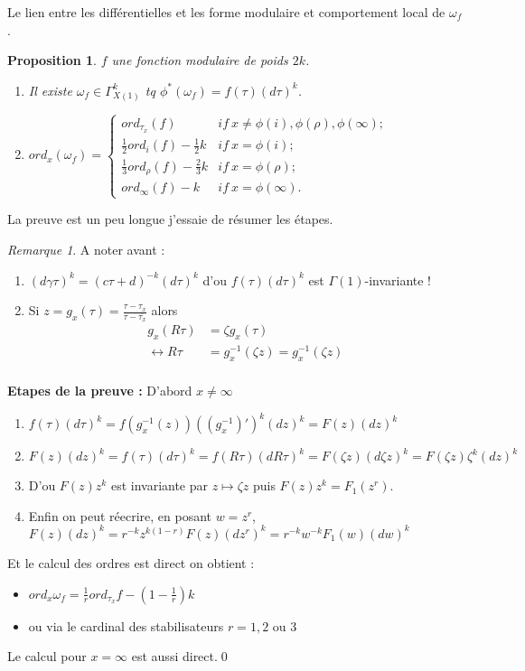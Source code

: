 \documentclass[12pt]{article}
\theoremstyle{plain}
\newtheorem{prop}[subsubsection]{Proposition}
\theoremstyle{definition}
\theoremstyle{remark}
\newtheorem{rem}{Remarque}
\newcommand{\w}{\omega}
\begin{document}
Le lien entre les différentielles et les forme modulaire et comportement local de $\w_f$.
\begin{prop}
    $f$ une fonction modulaire de poids $2k$.
    \begin{enumerate}
        \item Il existe $\w_f\in\Gamma_{X(1)}^k$ tq $\phi^*(\w_f)=f(\tau)(d\tau)^k$.
        \item $ord_x(\w_f)=\begin{cases}
            ord_{\tau_x}(f) &if~x\ne\phi(i),\phi(\rho),\phi(\infty);\\
            \frac{1}{2}ord_i(f)-\frac{1}{2}k &if~ x=\phi(i);\\
            \frac{1}{3}ord_{\rho}(f)-\frac{2}{3}k &if~x=\phi(\rho);\\
            ord_{\infty}(f)-k &if~x=\phi(\infty).
        \end{cases}$
    \end{enumerate}
\end{prop}
La preuve est un peu longue j'essaie de résumer les étapes.
\begin{rem} A noter avant :
    \begin{enumerate}
        \item $(d\gamma\tau)^k=(c\tau+d)^{-k}(d\tau)^k$ d'ou $f(\tau)(d\tau)^k$ est $\Gamma(1)$-invariante !
        \item Si $z=g_x(\tau)=\frac{\tau-\tau_x}{\tau-\overline{\tau_x}}$ alors 
        \begin{align*}
            g_x(R\tau)&=\zeta g_x(\tau)\\
            \leftrightarrow R\tau&=g_x^{-1}(\zeta z)=g_x^{-1}(\zeta z)\\
        \end{align*}
    \end{enumerate}
\end{rem}

\textbf{Etapes de la preuve :} D'abord $x\ne\infty$ \begin{enumerate}
    \item $f(\tau)(d\tau)^k=f(g_x^{-1}(z))((g_x^{-1})')^k(dz)^k=F(z)(dz)^k$
    \item $F(z)(dz)^k=f(\tau)(d\tau)^k=f(R\tau)(dR\tau)^k=F(\zeta z)(d\zeta z)^k=F(\zeta z)\zeta^k(dz)^k$
    \item D'ou $F(z)z^k$ est invariante par $z\mapsto \zeta z$ puis $F(z)z^k=F_1(z^r)$.
    \item Enfin on peut réecrire, en posant $w=z^r$, $F(z)(dz)^k=r^{-k}z^{k(1-r)}F(z)(dz^r)^k=r^{-k}w^{-k}F_1(w)(dw)^k$
\end{enumerate}
Et le calcul des ordres est direct on obtient :
\begin{itemize}
    \item $ord_x\w_f=\frac{1}{r}ord_{\tau_x}f-(1-\frac{1}{r})k$
    \item ou via le cardinal des stabilisateurs $r=1,2\text{ ou }3$
\end{itemize}
Le calcul pour $x=\infty$ est aussi direct.\qed
\end{document}
